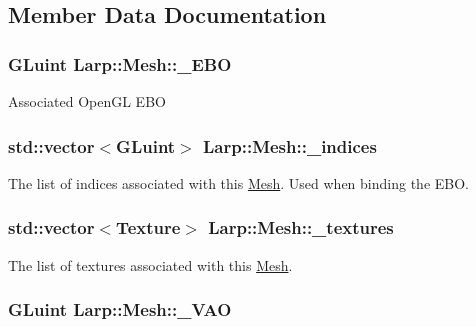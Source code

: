 \subsection{Member Data Documentation}
\hypertarget{classLarp_1_1Mesh_afffcf16bfa3010c480a9a09fd43a477e}{
\subsubsection[{\-\_\-\-E\-B\-O}]{\setlength{\rightskip}{0pt plus 5cm}G\-Luint Larp\-::\-Mesh\-::\-\_\-\-E\-B\-O\hspace{0.3cm}{\ttfamily [private]}}}\label{classLarp_1_1Mesh_afffcf16bfa3010c480a9a09fd43a477e}
Associated Open\-G\-L E\-B\-O \hypertarget{classLarp_1_1Mesh_af2ef7e4f28a5454c159d1f2684008926}{
\subsubsection[{\-\_\-indices}]{\setlength{\rightskip}{0pt plus 5cm}std\-::vector$<$G\-Luint$>$ Larp\-::\-Mesh\-::\-\_\-indices}}\label{classLarp_1_1Mesh_af2ef7e4f28a5454c159d1f2684008926}
The list of indices associated with this \hyperlink{classLarp_1_1Mesh}{Mesh}. Used when binding the E\-B\-O. \hypertarget{classLarp_1_1Mesh_a54c9edf45e99fb0261a39bfc3e8ff091}{
\subsubsection[{\-\_\-textures}]{\setlength{\rightskip}{0pt plus 5cm}std\-::vector$<${\bf Texture}$>$ Larp\-::\-Mesh\-::\-\_\-textures}}\label{classLarp_1_1Mesh_a54c9edf45e99fb0261a39bfc3e8ff091}
The list of textures associated with this \hyperlink{classLarp_1_1Mesh}{Mesh}. \hypertarget{classLarp_1_1Mesh_acba7ec21576ff64c769df9d374ed1cc5}{
\subsubsection[{\-\_\-\-V\-A\-O}]{\setlength{\rightskip}{0pt plus 5cm}G\-Luint Larp\-::\-Mesh\-::\-\_\-\-V\-A\-O\hspace{0.3cm}{\ttfamily [private]}}}\label{classLarp_1_1Mesh_acba7ec21576ff64c769df9d374ed1cc5}
